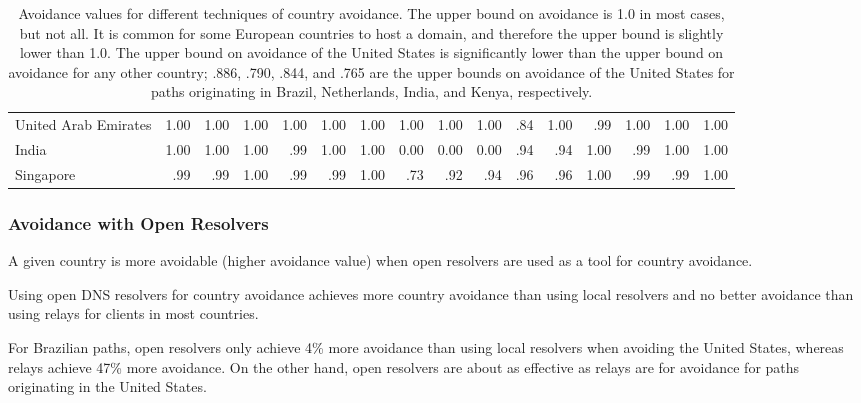 \begin{table*}[t]
{\begin{tabular}{P{32mm}|d{3.2}d{3.2}d{3.2}|d{3.2}d{3.2}d{3.2}|d{3.2}d{3.2}d{3.2}|d{3.2}d{3.2}d{3.2}|d{3.2}d{3.2}d{3.2}}
United Arab Emirates &1.00  &1.00   &1.00     &1.00 &1.00 &1.00   &1.00 &1.00   &1.00  &.84 &1.00  &.99  &1.00 &1.00 &1.00  \\
India                &1.00  &1.00   &1.00     &.99 &1.00 &1.00   &0.00 &0.00   &0.00  &.94 &.94  &1.00  &.99 &1.00 &1.00  \\
Singapore            &.99  &.99   &1.00     &.99 &.99 &1.00   &.73  &.92  &.94  &.96 &.96  &1.00  &.99 &.99 &1.00  \\\midrule
\end{tabular}
}
\caption{Avoidance values for different techniques of country avoidance.  The upper bound on avoidance is 1.0 in most cases, but not all.  It is 
common for some European countries to host a domain, and therefore the upper bound is slightly lower than 1.0.  The upper bound on avoidance of the 
United States is significantly lower than the upper bound on avoidance for any other country; .886, .790, .844, and .765 are the upper bounds on avoidance 
of the United States for paths originating in Brazil, Netherlands, India, and Kenya, respectively.}
\label{tab:avoid}
\end{table*}

\subsubsection{Avoidance with Open Resolvers}

A given country is more avoidable (higher avoidance value) when open
resolvers are used as a tool for country avoidance. 

\begin{finding}
Using open DNS resolvers for country avoidance achieves more country
avoidance than using local resolvers and no better
avoidance than using relays for clients in most
countries. 
\end{finding}
\noindent
For Brazilian paths, open resolvers only achieve 4\% more avoidance than
using local resolvers when avoiding the United States, whereas relays
achieve 47\% more avoidance.  On the other hand, open resolvers are
about as effective as relays are for avoidance for paths originating in
the United States.   

